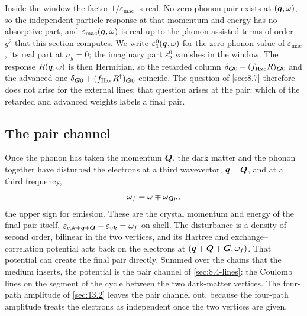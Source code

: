 Inside the window the factor $1/\varepsilon_{\mathrm{mac}}$ is real. No zero-phonon pair exists at $(\bm{q},\omega)$, so the independent-particle response at that momentum and energy has no absorptive part, and $\varepsilon_{\mathrm{mac}}(\bm{q},\omega)$ is real up to the phonon-assisted terms of order $g^2$ that this section computes. We write $\varepsilon_1^0(\bm{q},\omega)$ for the zero-phonon value of $\varepsilon_{\mathrm{mac}}$, its real part at $n_g = 0$; the imaginary part $\varepsilon_2^0$ vanishes in the window. The response $R(\bm{q},\omega)$ is then Hermitian, so the retarded column $\delta_{\bm{G}0} + (f_{\mathrm{Hxc}}R)_{\bm{G}0}$ and the advanced one $\delta_{\bm{G}0} + (f_{\mathrm{Hxc}}R^\dagger)_{\bm{G}0}$ coincide. The question of \cref{sec:8.7} therefore does not arise for the external lines; that question arises at the pair: which of the retarded and advanced weights labels a final pair.

\subsection{The pair channel}

Once the phonon has taken the momentum $\bm{Q}$, the dark matter and the phonon together have disturbed the electrons at a third wavevector, $\bm{q} + \bm{Q}$, and at a third frequency,
\begin{equation*}
  \omega_f = \omega \mp \omega_{\bm{Q}\nu} ,
\end{equation*}
the upper sign for emission. These are the crystal momentum and energy of the final pair itself, $\varepsilon_{c,\bm{k}+\bm{q}+\bm{Q}} - \varepsilon_{v\bm{k}} = \omega_f$ on shell. The disturbance is a density of second order, bilinear in the two vertices, and its Hartree and exchange--correlation potential acts back on the electrons at $(\bm{q}+\bm{Q}+\bm{G},\omega_f)$. That potential can create the final pair directly. Summed over the chains that the medium inserts, the potential is the pair channel of \cref{sec:8.4-lines}: the Coulomb lines on the segment of the cycle between the two dark-matter vertices. The four-path amplitude of \cref{sec:13.2} leaves the pair channel out, because the four-path amplitude treats the electrons as independent once the two vertices are given.

